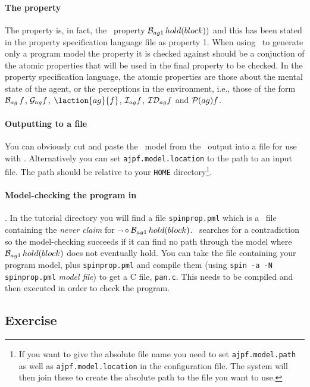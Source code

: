 \documentclass[a4]{article}
\begin{document}
\paragraph{The property} The property is, in fact, the \ajpf\ property $\mathrm{{\cal B}}_{ag1} \, hold(block))$ and this has been stated in the property specification language file as property 1.  When using \ajpf\ to generate only a program model the property it is checked against should be a conjuction of the atomic properties that will be used in the final property to be checked.  In the property specification language, the atomic properties are those about the mental state of the agent, or the perceptions in the environment, i.e., those of the form $\mathrm{{\cal B}}_{ag} \, f$, $\mathrm{{\cal G}}_{ag} f$, $\laction{ag}{f}$, $\mathrm{{\cal I}}_{ag} f$, $\mathrm{{\cal ID}}_{ag} f$ and $\mathrm{{\cal P}}(ag){f}$.

\paragraph{Outputting to a file} You can obviously cut and paste the \promela\ model from the \ajpf\ output into a file for use with \spin.  Alternatively you can set \texttt{ajpf.model.location} to the path to an input file.  The path should be relative to your \texttt{HOME} directory\footnote{If you want to give the absolute file name you need to set \texttt{ajpf.model.path} as well as \texttt{ajpf.model.location} in the configuration file.  The system will then join these to create the absolute path to the file you want to use.}.

\paragraph{Model-checking the program in \spin}.  In the tutorial directory you will find a file \texttt{spinprop.pml} which is a \promela\ file containing the \emph{never claim} for $\neg \diamond \mathrm{{\cal B}}_{ag1} \, hold(block)$.  \spin\ searches for a contradiction so the model-checking succeeds if it can find no path through the model where $\mathrm{{\cal B}}_{ag1} \, hold(block)$ does not eventually hold.  You can take the file containing  your program model, plus \texttt{spinprop.pml} and compile them (using \texttt{spin -a -N spinprop.pml} \emph{model file}) to get a C file, \texttt{pan.c}.  This needs to be compiled and then executed in order to check the program.

\subsection{Exercise}
\end{document}
